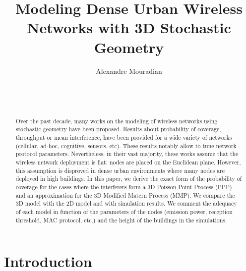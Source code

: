 \documentclass{sig-alternate-05-2015}
\begin{document}

\doi{}

\isbn{}

\title{Modeling Dense Urban Wireless Networks with 3D Stochastic Geometry}




\author{
\alignauthor
Alexandre Mouradian\\
       \\
       \\
       \\
}





\maketitle

\begin{abstract}
Over the past decade, many works on the modeling of wireless networks using stochastic geometry have been proposed. Results about probability of coverage, throughput or mean interference, have been provided for a wide variety of networks (cellular, ad-hoc, cognitive, sensors, etc). These results notably allow to tune network protocol parameters. Nevertheless, in their vast majority, these works assume that the wireless network deployment is flat: nodes are placed on the Euclidean plane. However, this assumption is disproved in dense urban environments where many nodes are deployed in high buildings.
In this paper, we derive the exact form of the probability of coverage for the cases where the interferers form a 3D Poisson Point Process (PPP) and an approximation for the 3D Modified Matern Process (MMP). We compare the 3D model with the 2D model and with simulation results. We comment the adequacy of each model in function of the parameters of the nodes (emission power, reception threshold, MAC protocol, etc.) and the height of the buildings in the simulations.
\end{abstract}


\section{Introduction}
\label{introsec}
\end{document}
